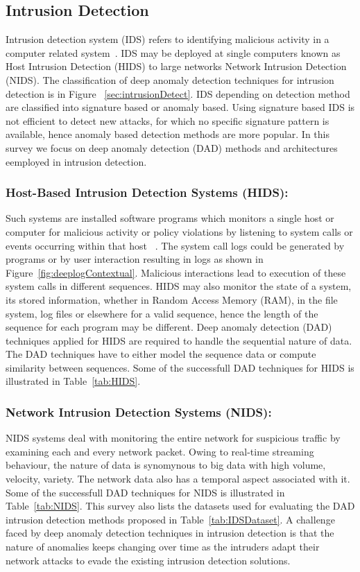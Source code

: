 \subsection{Intrusion Detection}
\label{sec:intrusion_detection}

Intrusion detection  system (IDS) refers to identifying malicious activity in a computer related system~\cite{phoha2002internet}. IDS may be deployed at single computers known as Host Intrusion Detection (HIDS) to large networks Network Intrusion Detection (NIDS). The classification of deep anomaly detection techniques for intrusion detection is in Figure ~\ref{sec:intrusionDetect}. IDS depending on detection method are classified into signature based or anomaly based. Using signature based IDS is not efficient to detect new attacks, for which no specific signature pattern is available, hence anomaly based detection methods are more popular. In this survey we focus on deep anomaly detection (DAD) methods and architectures eemployed in intrusion detection.

\subsubsection{Host-Based Intrusion Detection Systems (HIDS):}
 Such systems are installed software programs which monitors a single host or computer for malicious  activity or policy violations by listening to system calls or events occurring within that host ~\cite{vigna2005host}. The system call logs could be generated by programs or by user interaction resulting in logs as shown in Figure~\ref{fig:deeplogContextual}. Malicious interactions lead to execution of these system calls in different sequences. HIDS may also monitor the state of a system, its stored information, whether in Random Access Memory (RAM), in the file system, log files or elsewhere for a valid sequence, hence the length of the sequence for each program may be different.
 Deep anomaly detection (DAD) techniques applied for HIDS are required to handle the sequential nature of data. The DAD techniques have to either model the sequence data or compute similarity between sequences. Some of the successfull DAD techniques for HIDS is illustrated in Table~\ref{tab:HIDS}.

\subsubsection{Network Intrusion Detection Systems (NIDS):} NIDS systems deal with monitoring the entire network for suspicious traffic by examining each and every network packet. Owing to real-time streaming behaviour, the nature of data is synomynous to big data with high volume, velocity, variety. The network data also has a temporal aspect associated with it. Some of the successfull DAD techniques for NIDS is illustrated in Table~\ref{tab:NIDS}. This survey also lists the datasets used for evaluating the DAD intrusion detection methods proposed in Table~\ref{tab:IDSDataset}. A challenge faced by deep anomaly detection techniques in intrusion detection is that the nature of anomalies keeps changing over time as the intruders adapt their network attacks to evade the existing intrusion detection solutions.

